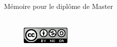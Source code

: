 \begin{titlepage}
\begin{center}
\begin{large}
\end{large}
\vfill

\begin{large}
Mémoire 
pour le diplôme de Master \\
\tnah \\
\end{large}
\begin{figure}[h]
    \centering
    \includegraphics{img/cc-icon.png}
    \label{fig:my_label}
\end{figure}

\end{center}
\end{titlepage}